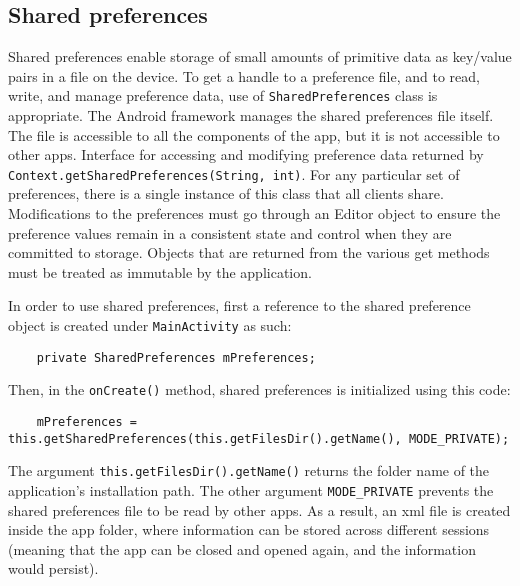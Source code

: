 \documentclass[
  a4paper,  %
  twoside,  %
  bibliography=totoc,
  headsepline,
  cleardoublepage=empty,
  parskip=half,
  draft=false,
  open=any
]{scrbook}
\begin{document}
\subsection{Shared preferences}
Shared preferences enable storage of small amounts of primitive data as key/value pairs in a file on the device. To get a handle to a preference file, and to read, write, and manage preference data, use of \texttt{SharedPreferences} class is appropriate. The Android framework manages the shared preferences file itself. The file is accessible to all the components of the app, but it is not accessible to other apps. Interface for accessing and modifying preference data returned by \texttt{Context.getSharedPreferences(String, int)}. For any particular set of preferences, there is a single instance of this class that all clients share. Modifications to the preferences must go through an Editor object to ensure the preference values remain in a consistent state and control when they are committed to storage. Objects that are returned from the various get methods must be treated as immutable by the application. 

In order to use shared preferences, first  a reference to the shared preference object is created under \texttt{MainActivity} as such:
\begin{lstlisting}
	private SharedPreferences mPreferences;
\end{lstlisting}
Then, in the \texttt{onCreate()} method, shared preferences is initialized using this code:
\begin{lstlisting}
	mPreferences = this.getSharedPreferences(this.getFilesDir().getName(), MODE_PRIVATE);
\end{lstlisting}
The argument \texttt{this.getFilesDir().getName()} returns the folder name of the application's installation path. The other argument \texttt{MODE\_PRIVATE} prevents the shared preferences file to be read by other apps. As a result, an xml file is created inside the app folder, where information can be stored across different sessions (meaning that the app can be closed and opened again, and the information would persist).  
\end{document}
